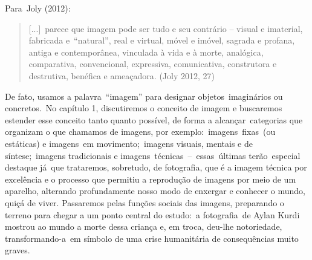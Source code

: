 \documentclass[
  letterpaper,
]{abntex2}
\begin{document}
Para~Joly (2012):

\begin{quote}
{[}...{]}~parece que imagem pode ser tudo e seu contrário -- visual e
imaterial, fabricada e~``natural'', real e virtual, móvel e imóvel,
sagrada e profana, antiga e contemporânea, vinculada à vida e à morte,
analógica, comparativa, convencional, expressiva, comunicativa,
construtora e destrutiva, benéfica e ameaçadora. (Joly 2012, 27)~
\end{quote}

De fato, usamos a palavra~``imagem'' para designar objetos~imaginários
ou concretos.~No capítulo 1, discutiremos o conceito de imagem e
buscaremos estender esse conceito tanto quanto possível, de forma a
alcançar~categorias que organizam o que chamamos de imagens, por
exemplo:~imagens~fixas~(ou estáticas) e imagens~em movimento;~imagens
visuais, mentais e de síntese;~imagens tradicionais e
imagens~técnicas~--~essas~últimas terão~especial destaque já~que
trataremos, sobretudo, de fotografia, que é a imagem técnica por
excelência e o processo que permitiu a reprodução de imagens por meio de
um aparelho, alterando profundamente nosso modo de enxergar e conhecer o
mundo, quiçá de viver. Passaremos pelas funções sociais das imagens,
preparando o terreno para chegar a um ponto central do estudo:~a
fotografia~de Aylan Kurdi mostrou ao mundo a morte dessa criança e, em
troca, deu-lhe notoriedade, transformando-a~em símbolo de uma crise
humanitária de consequências muito graves.~
\end{document}
